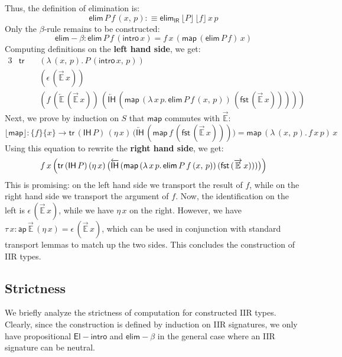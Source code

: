 \documentclass[acmsmall,screen,review]{acmart}
\newcommand{\msf}[1]{{\mathsf{#1}}}
\newcommand{\mbb}[1]{\mathbb{#1}}
\newcommand{\IR}{\msf{IR}}
\newcommand{\intro}{\msf{intro}}
\newcommand{\IH}{\msf{IH}}
\newcommand{\map}{\msf{map}}
\newcommand{\elim}{\msf{elim}}
\newcommand{\tr}{\msf{tr}}
\newcommand{\fst}{\msf{fst}}
\newcommand{\floord}[1]{\lfloor #1 \rfloor}
\newcommand{\ora}[1]{\overrightarrow{#1}}
\newcommand{\ola}[1]{\overleftarrow{#1}}
\newcommand{\ap}{\msf{ap}}
\newcommand{\E}{\mbb{E}}
\begin{document}
Thus, the definition of elimination is:
\[ \elim\,P\,f\,(x,\,p) :\equiv \elim_\IR\,\floord{P}\,\floord{f}\,x\,p \]
Only the $\beta$-rule remains to be constructed:
\[ \elim\!-\!\!\beta : \elim\,P\,f\,(\intro\,x) = f\,x\,(\map\,(\elim\,P\,f)\,x) \]
Computing definitions on the \textbf{left hand side}, we get:
\begin{alignat*}{3}
  & \tr\, &&(\lambda\,(x,\,p).\,P\,(\intro\,x,\,p))\\
  &       &&(\epsilon\,(\ora{\E}\,x))\\
  &       &&(f\,(\ola{\E}\,(\ora{\E}\,x))\,(\ola{\IH}\,(\map\,(\lambda\,x\,p.\,\elim\,P\,f\,(x,\,p))\,(\fst\,(\ora{\E}\,x)))))
\end{alignat*}
Next, we prove by induction on $S$ that $\map$ commutes with $\ora{\E}$:
\[ \floord{\map} : \{f\}\{x\} \to \tr\,(\IH\,P)\,(\eta\,x)\,\bigl(\ola{\IH}\,(\map\,f\,(\fst\,(\ora{\E}\,x)))\bigr) = \map\,(\lambda\,(x,\,p).\,f\,x\,p)\,x \]
Using this equation to rewrite the \textbf{right hand side}, we get:
\begin{alignat*}{3}
  f\,x\,\Bigl(\tr\,(\IH\,P)\,(\eta\,x)\,\bigl(\ola{\IH}\,(\map\,(\lambda\,x\,p.\,\elim\,P\,f\,(x,\,p))\,(\fst\,(\ora{\E}\,x)))\bigr)\Bigr)
\end{alignat*}
This is promising: on the left hand side we transport the result of $f$, while on the right hand
side we transport the argument of $f$. Now, the identification on the left is
$\epsilon\,(\ora{\E}\,x)$, while we have $\eta\,x$ on the right. However, we have $\tau\,x :
\ap\,\ora{\E}\,(\eta\,x) = \epsilon\,(\ora{\E}\,x)$, which can be used in conjunction with
standard transport lemmas to match up the two sides. This concludes the construction of IIR types.

\subsection{Strictness}
We briefly analyze the strictness of computation for constructed IIR types. Clearly, since the
construction is defined by induction on IIR signatures, we only have propositional
$\msf{El\!\!-\!\!intro}$ and $\elim\!-\!\!\beta$ in the general case where an IIR signature can be
neutral.
\end{document}
